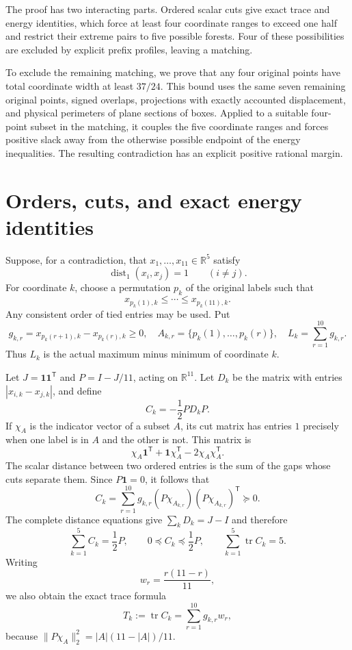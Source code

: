 \documentclass[11pt]{article}
\theoremstyle{definition}
\theoremstyle{remark}
\newcommand{\R}{\mathbb R}
\newcommand{\one}{\mathbf 1}
\newcommand{\tr}{\operatorname{tr}}
\newcommand{\dist}{\operatorname{dist}_1}
\newcommand{\abs}[1]{\left|#1\right|}
\begin{document}
The proof has two interacting parts. Ordered scalar cuts give exact trace
and energy identities, which force at least four coordinate ranges to
exceed one half and restrict their extreme pairs to five possible forests.
Four of these possibilities are excluded by explicit prefix profiles,
leaving a matching.

To exclude the remaining matching, we prove that any four original points
have total coordinate width at least $37/24$. This bound uses the same
seven remaining original points, signed overlaps, projections with exactly
accounted displacement, and physical perimeters of plane sections of boxes.
Applied to a suitable four-point subset in the matching, it couples the
five coordinate ranges and forces positive slack away from the otherwise
possible endpoint of the energy inequalities. The resulting contradiction
has an explicit positive rational margin.

\section{Orders, cuts, and exact energy identities}\label{sec:cuts}

Suppose, for a contradiction, that $x_1,\ldots,x_{11}\in\R^5$ satisfy
\begin{equation}\label{eq:unit}
 \dist(x_i,x_j)=1\qquad(i\ne j).
\end{equation}
For coordinate $k$, choose a permutation $p_k$ of the original labels such
that
\[
 x_{p_k(1),k}\leq\cdots\leq x_{p_k(11),k}.
\]
Any consistent order of tied entries may be used. Put
\[
 g_{k,r}=x_{p_k(r+1),k}-x_{p_k(r),k}\geq0,
 \quad A_{k,r}=\{p_k(1),\ldots,p_k(r)\},
 \quad L_k=\sum_{r=1}^{10}g_{k,r}.
\]
Thus $L_k$ is the actual maximum minus minimum of coordinate $k$.

Let $J=\one\one^{\mathsf T}$ and $P=I-J/11$, acting on $\R^{11}$.
Let $D_k$ be the matrix with entries $\abs{x_{i,k}-x_{j,k}}$, and define
\[
 C_k=-\frac12PD_kP.
\]
If $\chi_A$ is the indicator vector of a subset $A$, its cut matrix has
entries $1$ precisely when one label is in $A$ and the other is not. This
matrix is
\[
 \chi_A\one^{\mathsf T}+\one\chi_A^{\mathsf T}
       -2\chi_A\chi_A^{\mathsf T}.
\]
The scalar distance between two ordered entries is the sum of the gaps
whose cuts separate them. Since $P\one=0$, it follows that
\begin{equation}\label{eq:cutmatrix}
 C_k=\sum_{r=1}^{10}g_{k,r}
      (P\chi_{A_{k,r}})(P\chi_{A_{k,r}})^{\mathsf T}\succeq0.
\end{equation}
The complete distance equations give $\sum_kD_k=J-I$ and therefore
\begin{equation}\label{eq:operator}
 \sum_{k=1}^5C_k=\frac12P,
 \qquad 0\preceq C_k\preceq\frac12P,
 \qquad\sum_{k=1}^5\tr C_k=5.
\end{equation}
Writing
\[
 w_r=\frac{r(11-r)}{11},
\]
we also obtain the exact trace formula
\begin{equation}\label{eq:trace}
 T_k:=\tr C_k=\sum_{r=1}^{10}g_{k,r}w_r,
\end{equation}
because $\lVert P\chi_A\rVert_2^2=\abs{A}(11-\abs{A})/11$.
\end{document}
